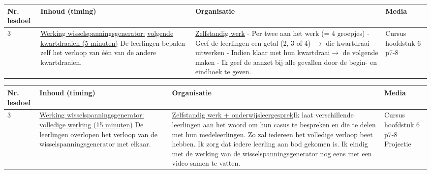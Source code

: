 \begin{landscape}
\begin{tabularx}{1.56\textwidth}{|p{1.5cm}|p{8cm}|X|p{4cm}|}
\hline
\textbf{Nr. lesdoel } & \textbf{Inhoud (timing)}  & \textbf{Organisatie } & \textbf{Media } \\ \hline
3& \underline{Werking wisselspanningsgenerator:} \underline{volgende kwartdraaien (5 minuten)}\newline
De leerlingen bepalen zelf het verloop van één van de andere kwartdraaien. 
&  \underline{Zelfstandig werk}\newline 
 - Per twee aan het werk (= 4 groepjes)\newline
 - Geef de leerlingen een getal (2, 3 of 4) $\rightarrow$ die kwartdraai uitwerken\newline
 - Indien klaar met hun kwartdraai$\rightarrow$ de volgende maken\newline
 - Ik geef de aanzet bij alle gevallen door de begin- en eindhoek te geven.
&  Cursus hoofdstuk 6 p7-8
\\ \hline
\end{tabularx}\vspace{5mm}

\begin{tabularx}{1.56\textwidth}{|p{1.5cm}|p{8cm}|X|p{4cm}|}
	\hline
	\textbf{Nr. lesdoel } & \textbf{Inhoud (timing)}  & \textbf{Organisatie } & \textbf{Media } \\ \hline
	3& \underline{Werking wisselspanningsgenerator:} \underline{volledige werking (15 minuten)}\newline
	De leerlingen overlopen het verloop van de wisselspanningsgenerator met elkaar. 
	&  \underline{Zelfstandig werk + onderwijsleergesprek}\newline  Ik laat verschillende leerlingen aan het woord om hun casus te bespreken en die te delen met hun medeleerlingen. Zo zal iedereen het volledige verloop beet hebben. Ik zorg dat iedere leerling aan bod gekomen is. Ik eindig met de werking van de wisselspanningsgenerator nog eens met een video samen te vatten.
	&  Cursus hoofdstuk 6 p7-8 \newline\newline Projectie
	\\ \hline
\end{tabularx}\vspace{5mm}




\end{landscape}
